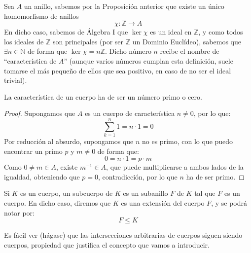 \begin{definicion}
    Sea $A$ un anillo, sabemos por la Proposición anterior que existe un único homomorfismo de anillos 
    \begin{equation*}
        \chi:\mathbb{Z}\to A
    \end{equation*}
    En dicho caso, sabemos de Álgebra I que $\ker\chi$ es un ideal en $\mathbb{Z}$, y como todos los ideales de $\mathbb{Z}$ son principales (por ser $\mathbb{Z}$ un Dominio Euclídeo), sabemos que $\exists n\in \mathbb{N}$ de forma que $\ker\chi = n\mathbb{Z}$. Dicho número $n$ recibe el nombre de ``característica de $A$'' (aunque varios números cumplan esta definición, suele tomarse el más pequeño de ellos que sea positivo, en caso de no ser el ideal trivial).
\end{definicion}

\begin{prop}
    La característica de un cuerpo ha de ser un número primo o cero.
    \begin{proof}
        Supongamos que $A$ es un cuerpo de característica $n\neq 0$, por lo que:
        \begin{equation*}
            \sum_{k=1}^{n}1 = n\cdot 1 = 0
        \end{equation*}
        Por reducción al absurdo, supongamos que $n$ no es primo, con lo que puedo encontrar un primo $p$ y $m\neq 0$ de forma que:
        \begin{equation*}
            0 = n\cdot 1 = p\cdot m
        \end{equation*}
        Como $0\neq m \in A$, existe $m^{-1}\in A$, que puede multiplicarse a ambos lados de la igualdad, obteniendo que $p = 0$, contradicción, por lo que $n$ ha de ser primo.
    \end{proof}
\end{prop}

\begin{definicion}
    Si $K$ es un cuerpo, un subcuerpo de $K$ es un subanillo $F$ de $K$ tal que $F$ es un cuerpo. En dicho caso, diremos que $K$ es una extensión del cuerpo $F$, y se podrá notar por:
    \begin{equation*}
        F\leq K
    \end{equation*}
\end{definicion}

\noindent
Es fácil ver (hágase) que las intersecciones arbitrarias de cuerpos siguen siendo cuerpos, propiedad que justifica el concepto que vamos a introducir.

